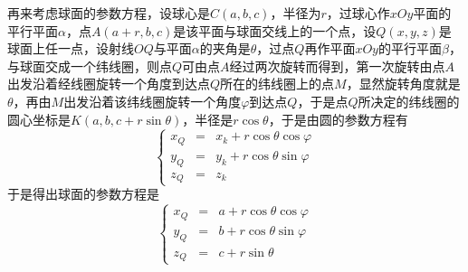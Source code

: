 再来考虑球面的参数方程，设球心是$C(a,b,c)$，半径为$r$，过球心作$xOy$平面的平行平面$\alpha$，点$A(a+r,b,c)$是该平面与球面交线上的一个点，设$Q(x,y,z)$是球面上任一点，设射线$OQ$与平面$\alpha$的夹角是$\theta$，过点$Q$再作平面$xOy$的平行平面$\beta$，与球面交成一个纬线圈，则点$Q$可由点$A$经过两次旋转而得到，第一次旋转由点$A$出发沿着经线圈旋转一个角度到达点$Q$所在的纬线圈上的点$M$，显然旋转角度就是$\theta$，再由$M$出发沿着该纬线圈旋转一个角度$\varphi$到达点$Q$，于是点$Q$所决定的纬线圈的圆心坐标是$K(a,b,c+r\sin{\theta})$，半径是$r\cos{\theta}$，于是由圆的参数方程有
\[ \left\{
    \begin{array}{lll}
      x_Q & = & x_k + r \cos{\theta}\cos{\varphi}  \\
      y_Q & = & y_k + r \cos{\theta}\sin{\varphi} \\
      z_Q & = & z_k
    \end{array}
  \right. \]
于是得出球面的参数方程是
\[ \left\{
    \begin{array}{lll}
      x_Q & = & a + r \cos{\theta}\cos{\varphi}  \\
      y_Q & = & b + r \cos{\theta}\sin{\varphi} \\
      z_Q & = & c+r\sin{\theta}
    \end{array}
  \right. \]



